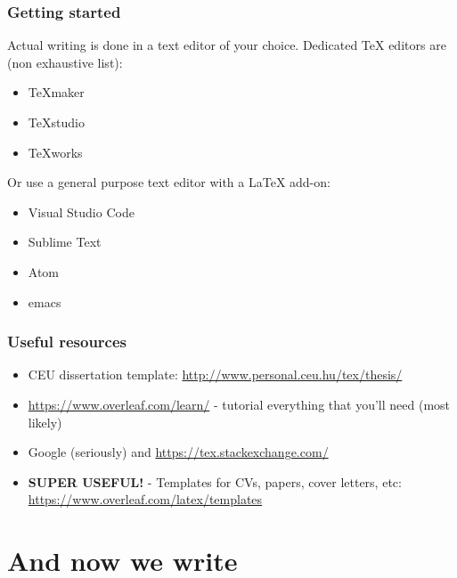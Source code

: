 \documentclass{beamer}
\begin{document}

\begin{frame}
\frametitle{Getting started}
Actual writing is done in a text editor of your choice. Dedicated TeX editors are (non exhaustive list):

\begin{itemize}
		\item TeXmaker
		\item TeXstudio
		\item TeXworks
\end{itemize}

Or use a general purpose text editor with a LaTeX add-on:

\begin{itemize}
	\item Visual Studio Code
	\item Sublime Text
	\item Atom
	\item emacs
\end{itemize}

\end{frame}


\begin{frame}
\frametitle{Useful resources}
\begin{itemize}
\item CEU dissertation template: \url{http://www.personal.ceu.hu/tex/thesis/}
\item \url{https://www.overleaf.com/learn/} - tutorial everything that you'll need (most likely)
\item Google (seriously) and \url{https://tex.stackexchange.com/}
\item \textbf{SUPER USEFUL!} - Templates for CVs, papers, cover letters, etc: \url{https://www.overleaf.com/latex/templates}
\end{itemize}
\end{frame}


\section{And now we write}
\end{document}
